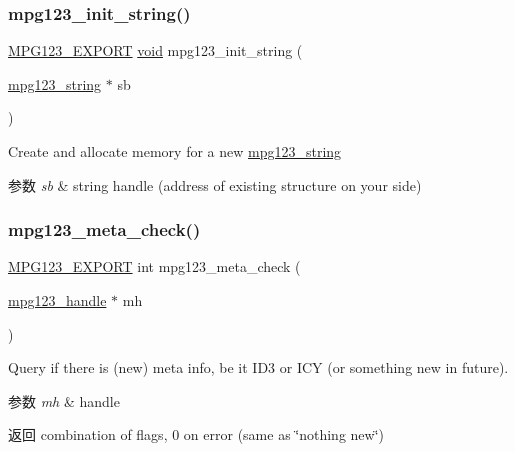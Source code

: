 \subsubsection{\texorpdfstring{mpg123\+\_\+init\+\_\+string()}{mpg123\_init\_string()}}
{\footnotesize\ttfamily \hyperlink{mpg123_8h_a2ba98cfba3f760879df70e755b2a61cc}{M\+P\+G123\+\_\+\+E\+X\+P\+O\+RT} \hyperlink{interfacevoid}{void} mpg123\+\_\+init\+\_\+string (\begin{DoxyParamCaption}\item[{\hyperlink{structmpg123__string}{mpg123\+\_\+string} $\ast$}]{sb }\end{DoxyParamCaption})}

Create and allocate memory for a new \hyperlink{structmpg123__string}{mpg123\+\_\+string} 
\begin{DoxyParams}{参数}
{\em sb} & string handle (address of existing structure on your side) \\
\hline
\end{DoxyParams}
\mbox{\label{group__mpg123__metadata_ga1cd6279a1273f63eb8dcc8a554d815bb}} 
\subsubsection{\texorpdfstring{mpg123\+\_\+meta\+\_\+check()}{mpg123\_meta\_check()}}
{\footnotesize\ttfamily \hyperlink{mpg123_8h_a2ba98cfba3f760879df70e755b2a61cc}{M\+P\+G123\+\_\+\+E\+X\+P\+O\+RT} int mpg123\+\_\+meta\+\_\+check (\begin{DoxyParamCaption}\item[{\hyperlink{group__mpg123__init_ga6728e2839a395f3a07d4514da659faca}{mpg123\+\_\+handle} $\ast$}]{mh }\end{DoxyParamCaption})}

Query if there is (new) meta info, be it I\+D3 or I\+CY (or something new in future). 
\begin{DoxyParams}{参数}
{\em mh} & handle \\
\hline
\end{DoxyParams}
\begin{DoxyReturn}{返回}
combination of flags, 0 on error (same as \char`\"{}nothing new\char`\"{}) 
\end{DoxyReturn}
\mbox{\label{group__mpg123__metadata_ga4bca410c7589658fb8379b3cf3fa3e05}} 
